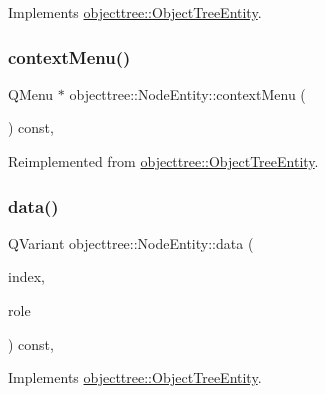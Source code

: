Implements \mbox{\hyperlink{classobjecttree_1_1_object_tree_entity_a70fd25eccf88b305e9db15fbe3daeae8}{objecttree\+::\+Object\+Tree\+Entity}}.

\mbox{\label{classobjecttree_1_1_node_entity_a03445bba05e894cefaa96aeb49abeacc}} 
\subsubsection{\texorpdfstring{contextMenu()}{contextMenu()}}
{\footnotesize\ttfamily Q\+Menu $\ast$ objecttree\+::\+Node\+Entity\+::context\+Menu (\begin{DoxyParamCaption}{ }\end{DoxyParamCaption}) const\hspace{0.3cm}{\ttfamily [override]}, {\ttfamily [virtual]}}



Reimplemented from \mbox{\hyperlink{classobjecttree_1_1_object_tree_entity_a0dd10b6074f96af281b6f7a68c492b75}{objecttree\+::\+Object\+Tree\+Entity}}.

\mbox{\label{classobjecttree_1_1_node_entity_af154f5a4972a033ac7303225aeae81cc}} 
\subsubsection{\texorpdfstring{data()}{data()}}
{\footnotesize\ttfamily Q\+Variant objecttree\+::\+Node\+Entity\+::data (\begin{DoxyParamCaption}\item[{const Q\+Model\+Index \&}]{index,  }\item[{int}]{role }\end{DoxyParamCaption}) const\hspace{0.3cm}{\ttfamily [override]}, {\ttfamily [virtual]}}



Implements \mbox{\hyperlink{classobjecttree_1_1_object_tree_entity_a2413c6573de18b451d97eb3800f10f35}{objecttree\+::\+Object\+Tree\+Entity}}.

\mbox{\label{classobjecttree_1_1_node_entity_ac710602e9c61c23ebf718c815044eff7}} 
